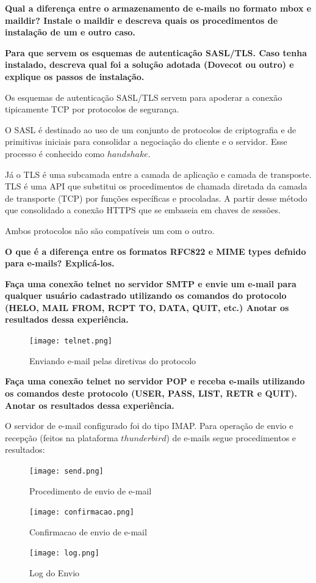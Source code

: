\documentclass[12pt,answers]{exam}
\begin{document}
\begin{questions}
\question \textbf{Qual a diferença entre o armazenamento de e-mails no formato mbox e maildir? Instale o maildir e descreva quais os procedimentos de instalação de um e outro caso.}



\question \textbf{Para que servem os esquemas de autenticação SASL/TLS. Caso tenha instalado, descreva qual foi a solução adotada (Dovecot ou outro) e explique os passos de instalação.}

  Os esquemas de autenticação SASL/TLS servem para apoderar a conexão tipicamente TCP por protocolos de segurança. 

O SASL é destinado ao uso de um conjunto de protocolos de criptografia e de primitivas iniciais para consolidar a negociação do cliente e o servidor. Esse processo é conhecido como $handshake$.

Já o TLS é uma subcamada entre a camada de aplicação e camada de transposte. TLS é uma API que substitui os procedimentos de chamada diretada da camada de transporte (TCP) por funções específicas e procoladas. A partir desse método que consolidado a conexão HTTPS que se embaseia em chaves de sessões.

Ambos protocolos não são compatíveis um com o outro.

\question \textbf{O que é a diferença entre os formatos RFC822 e MIME types defnido para e-mails? Explicá-los.}




\question \textbf{ Faça uma conexão telnet no servidor SMTP e envie um e-mail para qualquer usuário cadastrado utilizando os comandos do protocolo (HELO, MAIL FROM, RCPT TO, DATA, QUIT, etc.) Anotar os resultados dessa experiência.}

\begin{figure}[h]
     \centering
       \texttt{[image: telnet.png]}
     \caption{Enviando e-mail pelas diretivas do protocolo}
\end{figure}


\question \textbf{Faça uma conexão telnet no servidor POP e receba e-mails utilizando os comandos deste protocolo (USER, PASS, LIST, RETR e QUIT). Anotar os resultados dessa experiência.}

O servidor de e-mail configurado foi do tipo IMAP. Para operação de envio e recepção (feitos na plataforma $thunderbird$) de e-mails segue procedimentos e resultados:

\begin{figure}[h]
     \centering
       \texttt{[image: send.png]}
     \caption{Procedimento de envio de e-mail}
\end{figure}

\begin{figure}[h]
     \centering
       \texttt{[image: confirmacao.png]}
     \caption{Confirmacao de envio de e-mail}
\end{figure}

\begin{figure}[h]
     \centering
       \texttt{[image: log.png]}
     \caption{Log do Envio}
\end{figure}

\end{questions}
	
\end{document}

